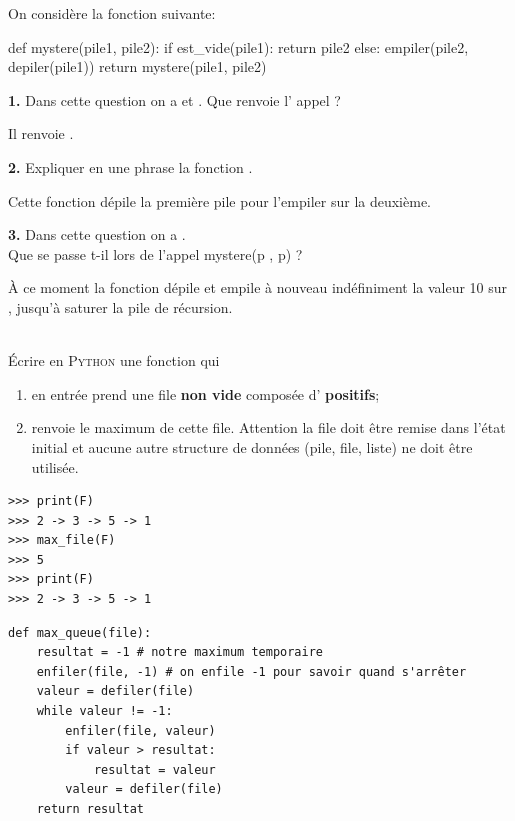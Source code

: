 \documentclass[a4paper,10pt,french]{book}
\begin{document}
On considère la fonction suivante:

\begin{pythoncode}
def mystere(pile1, pile2):
    if est_vide(pile1):
        return pile2
    else:
        empiler(pile2, depiler(pile1))       
        return mystere(pile1, pile2)
    \end{pythoncode}



\textbf{1.} Dans cette question on a  et . Que renvoie l' appel  ?
\begin{encadre}[Réponse]
Il renvoie .
\end{encadre} 
\textbf{2.} Expliquer en une phrase la fonction .
\begin{encadre}[Réponse]
Cette fonction dépile la première pile pour l'empiler sur la deuxième.
\end{encadre} 
\textbf{3.} Dans cette question on a .\\
    Que se passe t-il lors de l’appel mystere(p , p) ?
\begin{encadre}[Réponse]
À ce moment la fonction dépile et empile à nouveau indéfiniment la valeur 10 sur , jusqu'à saturer la pile de récursion. 
\end{encadre} 


\exo\\


\'Ecrire en \textsc{Python} une fonction  qui
\begin{enumerate}[--]
    \item 	en entrée prend une file \textbf{non vide} composée d' \textbf{positifs};
    \item 	renvoie le maximum de cette file. Attention la file doit être remise dans l'état initial et aucune autre structure de données (pile, file, liste) ne doit être utilisée.
\end{enumerate}

\begin{exemple}[ d'utilisation]
\begin{verbatim}
>>> print(F)
>>> 2 -> 3 -> 5 -> 1
>>> max_file(F)
>>> 5
>>> print(F)
>>> 2 -> 3 -> 5 -> 1
\end{verbatim}
\end{exemple}
\begin{encadre}[Réponse]
\begin{verbatim}
def max_queue(file):
    resultat = -1 # notre maximum temporaire
    enfiler(file, -1) # on enfile -1 pour savoir quand s'arrêter
    valeur = defiler(file)
    while valeur != -1:
        enfiler(file, valeur)
        if valeur > resultat:
            resultat = valeur
        valeur = defiler(file)
    return resultat
\end{verbatim}
\end{encadre}
\end{document}
